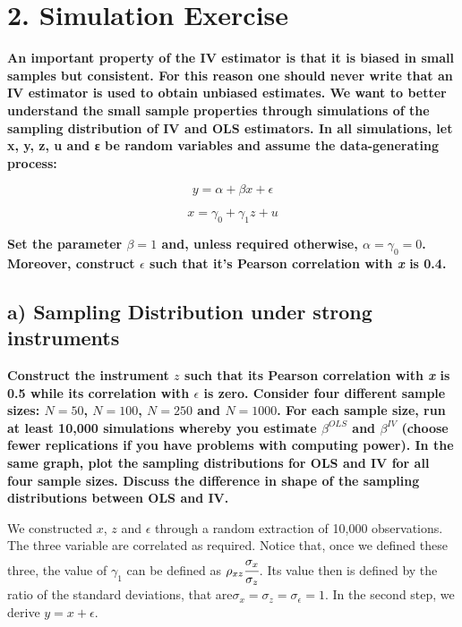 \documentclass[a4paper,12pt,oneside,English]{article}
\begin{document}
\newpage


\section{2. Simulation Exercise}

\textbf{An important property of the IV estimator is that it is biased in small samples but consistent. For this reason one should never write that an IV estimator is used to obtain unbiased estimates. We want to better understand the small sample properties through simulations of the sampling distribution of IV and OLS estimators. In all simulations, let x, y, z, u and ε be random variables and assume the data-generating process:}

\begin{equation}
    y = \alpha+\beta x+ \epsilon
\end{equation}

\begin{equation}
    x = \gamma_0+\gamma_1z+ u
\end{equation}

\textbf{Set the parameter $\beta = 1$ and, unless required otherwise, $\alpha = \gamma_0 = 0$. Moreover, construct $\epsilon$ such that it's Pearson correlation with \textit{x} is 0.4.}


\subsection{a) Sampling Distribution under strong instruments}

\textbf{Construct the instrument $z$ such that its Pearson correlation with \textit{x} is 0.5 while its correlation with $\epsilon$ is zero. Consider four different sample sizes: $N = 50$, $N = 100$, $N = 250$ and $N = 1000$. For each sample size, run at least 10,000 simulations whereby you estimate $\beta^{OLS}$ and $\beta^{IV}$ (choose fewer replications if you have problems with computing power). In the same graph, plot the sampling distributions for OLS and IV for all four sample sizes. Discuss the difference in shape of the sampling distributions between OLS and IV.}

We constructed $x$, $z$ and $\epsilon$ through a random extraction of 10,000 observations. The three variable are correlated as required. Notice that, once we defined these three, the value of $\gamma_1$ can be defined as $\rho_{xz}\cfrac{\sigma_x}{\sigma_z}$. Its value then is defined by the ratio of the standard deviations, that are$\sigma_x=\sigma_z=\sigma_\epsilon=1$. In the second step, we derive $y=x+\epsilon$.
\end{document}
